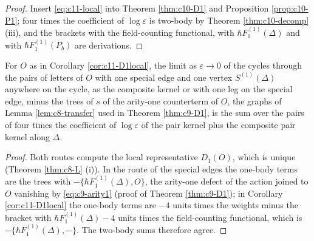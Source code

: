 \begin{proof}
Insert \eqref{eq:c11-local} into Theorem \ref{thm:c10-D1} and Proposition \ref{prop:c10-P1}; four times the coefficient of $\log\varepsilon$ is two-body by Theorem \ref{thm:c10-decomp} (iii), and the brackets with the field-counting functional, with $\hbar F_1^{(1)}(\Delta)$ and with $\hbar F_1^{(1)}(P_b)$ are derivations.
\end{proof}

\begin{proposition}
\label{prop:c11-routes}
For $O$ as in Corollary \ref{cor:c11-D1local}, the limit as $\varepsilon\to0$ of the cycles through the pairs of letters of $O$ with one special edge and one vertex $S^{(1)}(\Delta)$ anywhere on the cycle, as the composite kernel or with one leg on the special edge, minus the trees of $s$ of the arity-one counterterm of $O$, the graphs of Lemma \ref{lem:c8-transfer} used in Theorem \ref{thm:c9-D1}, is the sum over the pairs of four times the coefficient of $\log\varepsilon$ of the pair kernel plus the composite pair kernel along $\Delta$.
\end{proposition}

\begin{proof}
Both routes compute the local representative $D_1(O)$, which is unique (Theorem \ref{thm:c8-L} (i)). In the route of the special edges the one-body terms are the trees with $-\{\hbar F_1^{(1)}(\Delta),O\}$, the arity-one defect of the action joined to $O$ vanishing by \eqref{eq:c9-arity1} (proof of Theorem \ref{thm:c9-D1}); in Corollary \ref{cor:c11-D1local} the one-body terms are $-4$ units times the weights minus the bracket with $\hbar F_1^{(1)}(\Delta)-4$ units times the field-counting functional, which is $-\{\hbar F_1^{(1)}(\Delta),-\}$. The two-body sums therefore agree.
\end{proof}

